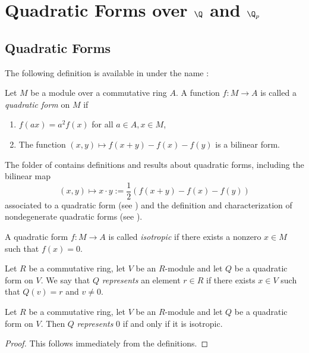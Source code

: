 \chapter[Quadratic Forms over the Rationals and the p-adics]{Quadratic Forms over $\Q$ and $\Q_p$}

\section{Quadratic Forms}\label{sec:quadratic_form}

The following definition is available in \mathlib under the name :
\begin{definition}\label{def:quadratic_form}
\mathlibok
Let $M$ be a module over a commutative ring $A$. A function $f : M \to A$ is called a \emph{quadratic form} on $M$ if
\begin{enumerate}
\item $f(ax) = a^2f(x)$ for all $a \in A, x \in M$,
\item The function $(x, y) \mapsto f(x + y) - f(x) - f(y)$ is a bilinear form.
\end{enumerate}
\end{definition}

The  folder of \mathlib contains definitions and results about quadratic forms, including the bilinear map
\[ (x, y) \mapsto x \cdot y := \frac{1}{2}(f(x + y) - f(x) - f(y))\] associated to a quadratic form (see ) and the definition and characterization of nondegenerate quadratic forms (see ).

\begin{definition}\label{def:isotropic}
\leanok
A quadratic form $f : M \to A$ is called \emph{isotropic} if there exists a nonzero $x \in M$ such that $f(x) = 0$.
\end{definition}

\begin{definition}\label{def:represents}
	\leanok
	Let $R$ be a commutative ring, let $V$ be an $R$-module and let $Q$ be a quadratic form on $V$. We say that $Q$ \emph{represents} an element $r \in R$ if there exists $x \in V$ such that $Q(v) = r$ and $v \ne 0$.
\end{definition}

\begin{lemma}\label{lem:represents_zero}
	\leanok
	Let $R$ be a commutative ring, let $V$ be an $R$-module and let $Q$ be a quadratic form on $V$. Then $Q$ \emph{represents} $0$ if and only if it is isotropic.
\end{lemma}
\begin{proof}
	\leanok
	This follows immediately from the definitions.
\end{proof}


